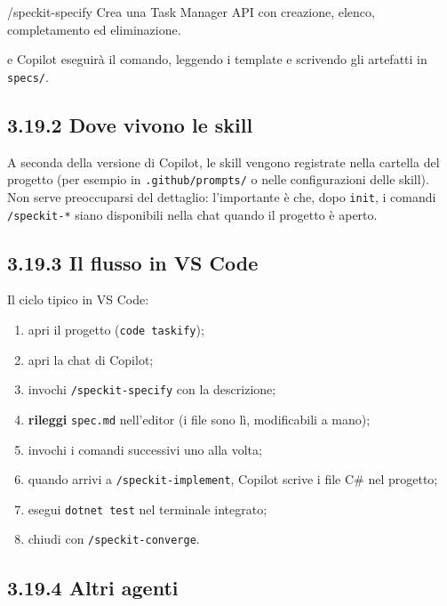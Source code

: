 \documentclass[
  italian,
  10pt,
]{book}
\newenvironment{Shaded}{\begin{snugshade}}{\end{snugshade}}
\newcommand{\NormalTok}[1]{#1}
\providecommand{\tightlist}{%
  \setlength{\itemsep}{0pt}\setlength{\parskip}{0pt}}
\begin{document}
\begin{Shaded}
\begin{Highlighting}[]
\NormalTok{/speckit{-}specify Crea una Task Manager API con creazione, elenco, completamento ed eliminazione.}
\end{Highlighting}
\end{Shaded}

e Copilot eseguirà il comando, leggendo i template e scrivendo gli
artefatti in \texttt{specs/}.

\subsection{3.19.2 Dove vivono le skill}\label{dove-vivono-le-skill}

A seconda della versione di Copilot, le skill vengono registrate nella
cartella del progetto (per esempio in \texttt{.github/prompts/} o nelle
configurazioni delle skill). Non serve preoccuparsi del dettaglio:
l'importante è che, dopo \texttt{init}, i comandi \texttt{/speckit-*}
siano disponibili nella chat quando il progetto è aperto.

\subsection{3.19.3 Il flusso in VS Code}\label{il-flusso-in-vs-code}

Il ciclo tipico in VS Code:

\begin{enumerate}
\def\labelenumi{\arabic{enumi}.}
\tightlist
\item
  apri il progetto (\texttt{code\ taskify});
\item
  apri la chat di Copilot;
\item
  invochi \texttt{/speckit-specify} con la descrizione;
\item
  \textbf{rileggi} \texttt{spec.md} nell'editor (i file sono lì,
  modificabili a mano);
\item
  invochi i comandi successivi uno alla volta;
\item
  quando arrivi a \texttt{/speckit-implement}, Copilot scrive i file C\#
  nel progetto;
\item
  esegui \texttt{dotnet\ test} nel terminale integrato;
\item
  chiudi con \texttt{/speckit-converge}.
\end{enumerate}

\subsection{3.19.4 Altri agenti}\label{altri-agenti}
\end{document}
